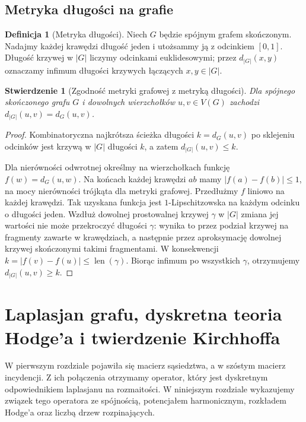 \documentclass[11pt,a4paper]{report}
\numberwithin{equation}{section}
\theoremstyle{plain}
\newtheorem{stwierdzenie}[twierdzenie]{Stwierdzenie}
\theoremstyle{definition}
\newtheorem{definicja}[twierdzenie]{Definicja}
\theoremstyle{remark}
\begin{document}
\section{Metryka długości na grafie}
\label{sec:tg-metric}

\begin{definicja}[Metryka długości]
Niech $G$ będzie spójnym grafem skończonym. Nadajmy każdej
krawędzi długość jeden i utożsammy ją z odcinkiem $[0,1]$.
Długość krzywej w $|G|$ liczymy odcinkami euklidesowymi;
przez $d_{|G|}(x,y)$ oznaczamy infimum długości krzywych
łączących $x,y\in|G|$.
\end{definicja}

\begin{stwierdzenie}[Zgodność metryki grafowej z metryką długości]
Dla spójnego skończonego grafu $G$ i dowolnych wierzchołków
$u,v\in V(G)$ zachodzi $d_{|G|}(u,v)=d_G(u,v)$.
\end{stwierdzenie}

\begin{proof}
Kombinatoryczna najkrótsza ścieżka długości $k=d_G(u,v)$
po sklejeniu odcinków jest krzywą w $|G|$ długości $k$,
a zatem $d_{|G|}(u,v)\le k$.

Dla nierówności odwrotnej określmy na wierzchołkach funkcję
$f(w)=d_G(u,w)$. Na końcach każdej krawędzi $ab$ mamy
$|f(a)-f(b)|\le1$, na mocy nierówności trójkąta dla
metryki grafowej. Przedłużmy $f$ liniowo na każdej krawędzi.
Tak uzyskana funkcja jest $1$-Lipschitzowska na każdym
odcinku o długości jeden. Wzdłuż dowolnej prostowalnej
krzywej $\gamma$ w $|G|$ zmiana jej wartości nie może
przekroczyć długości $\gamma$: wynika to przez podział
krzywej na fragmenty zawarte w krawędziach, a następnie
przez aproksymację dowolnej krzywej skończonymi takimi
fragmentami. W konsekwencji
$k=|f(v)-f(u)|\le\operatorname{len}(\gamma)$.
Biorąc infimum po wszystkich $\gamma$, otrzymujemy
$d_{|G|}(u,v)\ge k$.
\end{proof}

\chapter{Laplasjan grafu, dyskretna teoria Hodge'a i twierdzenie Kirchhoffa}
\label{ch:tg-laplacian}

W pierwszym rozdziale pojawiła się macierz sąsiedztwa, a w szóstym
macierz incydencji. Z ich połączenia otrzymamy operator, który
jest dyskretnym odpowiednikiem laplasjanu na rozmaitości.
W niniejszym rozdziale wykazujemy związek tego operatora
ze spójnością, potencjałem harmonicznym, rozkładem Hodge'a
oraz liczbą drzew rozpinających.
\end{document}
